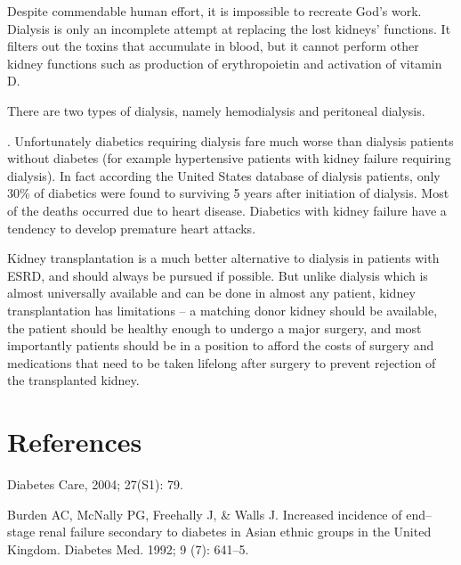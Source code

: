 {Despite commendable human effort, it is impossible to recreate God’s work. Dialysis is only an incomplete attempt at replacing the lost kidneys’ functions. It filters out the toxins that accumulate in blood, but it cannot perform other kidney functions such as production of erythropoietin and activation of vitamin D.

There are two types of dialysis, namely hemodialysis and peritoneal dialysis.

. Unfortunately diabetics requiring dialysis fare much worse than dialysis patients without diabetes (for example hypertensive patients with kidney failure requiring dialysis). In fact according the United States database of dialysis patients, only 30\% of diabetics were found to surviving 5 years after initiation of dialysis. Most of the deaths occurred due to heart disease. Diabetics with kidney failure have a tendency to develop premature heart attacks.


Kidney transplantation is a much better alternative to dialysis in patients with ESRD, and should always be pursued if possible. But unlike dialysis which is almost universally available and can be done in almost any patient, kidney transplantation has limitations – a matching donor kidney should be available, the patient should be healthy enough to undergo a major surgery, and most importantly patients should be in a position to afford the costs of surgery and medications that need to be taken lifelong after surgery to prevent rejection of the transplanted kidney.


\section*{References}

\begin{thebibliography}{99}
 Diabetes Care, 2004; 27(S1): 79.

  Burden AC, McNally PG, Freehally J, \& Walls J. Increased incidence of end–stage renal failure secondary to diabetes in Asian ethnic groups in the United Kingdom. Diabetes Med. 1992; 9 (7): 641–5.


\end{thebibliography}}
